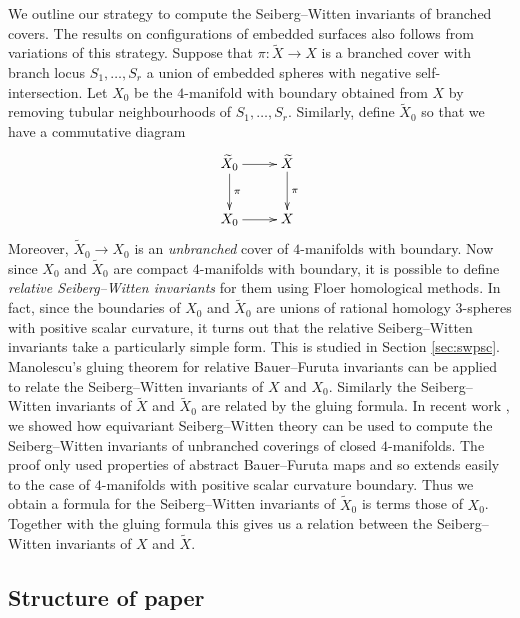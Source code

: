 \documentclass{amsart}
\theoremstyle{definition}
\theoremstyle{remark}
\numberwithin{equation}{section}
\begin{document}
We outline our strategy to compute the Seiberg--Witten invariants of branched covers. The results on configurations of embedded surfaces also follows from variations of this  strategy. Suppose that $\pi : \widetilde{X} \to X$ is a branched cover with branch locus $S_1, \dots , S_r$ a union of embedded spheres with negative self-intersection. Let $X_0$ be the $4$-manifold with boundary obtained from $X$ by removing tubular neighbourhoods of $S_1, \dots , S_r$. Similarly, define $\widetilde{X}_0$ so that we have a commutative diagram
\[
\xymatrix{
\widetilde{X}_0 \ar[d]^-\pi \ar[r] & \widetilde{X} \ar[d]^-\pi \\
X_0 \ar[r] & X
}
\]
Moreover, $\widetilde{X}_0 \to X_0$ is an {\em unbranched} cover of $4$-manifolds with boundary. Now since $X_0$ and $\widetilde{X}_0$ are compact $4$-manifolds with boundary, it is possible to define {\em relative Seiberg--Witten invariants} for them using Floer homological methods. In fact, since the boundaries of $X_0$ and $\widetilde{X}_0$ are unions of rational homology $3$-spheres with positive scalar curvature, it turns out that the relative Seiberg--Witten invariants take a particularly simple form. This is studied in Section \ref{sec:swpsc}. Manolescu's gluing theorem for relative Bauer--Furuta invariants \cite{man2} can be applied to relate the Seiberg--Witten invariants of $X$ and $X_0$. Similarly the Seiberg--Witten invariants of $\widetilde{X}$ and $\widetilde{X}_0$ are related by the gluing formula. In recent work \cite{bar}, we showed how equivariant Seiberg--Witten theory can be used to compute the Seiberg--Witten invariants of unbranched coverings of closed $4$-manifolds. The proof only used properties of abstract Bauer--Furuta maps and so extends easily to the case of $4$-manifolds with positive scalar curvature boundary. Thus we obtain a formula for the Seiberg--Witten invariants of $\widetilde{X}_0$ is terms those of $X_0$. Together with the gluing formula this gives us a relation between the Seiberg--Witten invariants of $X$ and $\widetilde{X}$.



\subsection{Structure of paper}
\end{document}
